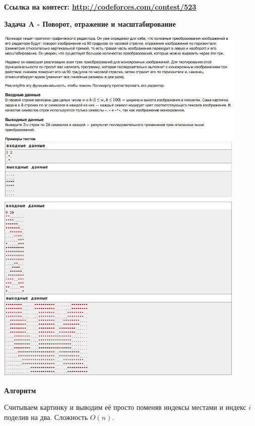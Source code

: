 \documentclass[a4paper,12pt]{article}
\begin{document}
\textbf{{\large Ссылка на контест: \url{http://codeforces.com/contest/523}}}

\newpage
\textbf{{\large Задача A - Поворот, отражение и масштабирование}} \\
\begin{center}
\includegraphics[width=0.9\textwidth]{VK_Qual_2/VK_Qual_A1.png}\\
\includegraphics[width=0.9\textwidth]{VK_Qual_2/VK_Qual_A2.png}\\ [1cm]
\end{center}

\textbf{{\large Алгоритм}}

Считываем картинку и выводим её просто поменяв индексы местами и индекс $i$ поделив на два. Сложность $O(n)$.\\
\end{document}
